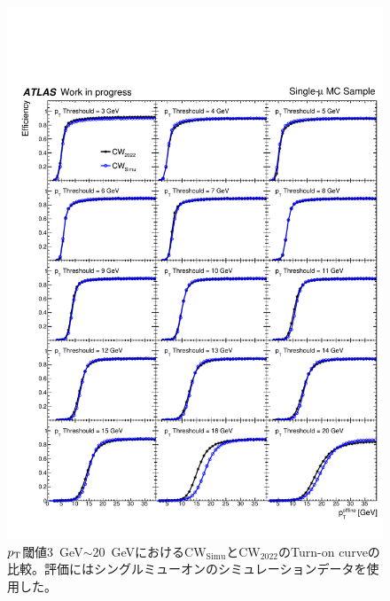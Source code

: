 \begin{figure}[p]
  \centering
  \includegraphics[clip, width=14cm]{fig/5/c2_re.pdf}
  \caption{$p_{\rm{T}}$閾値3~GeV$\sim$20~GeVにおける$\mathrm{CW_{Simu}}$と$\mathrm{CW_{2022}}$のTurn-on curveの比較。評価にはシングルミューオンのシミュレーションデータを使用した。}
  \label{fig:v05v07_1_9_Simu}
\end{figure}





